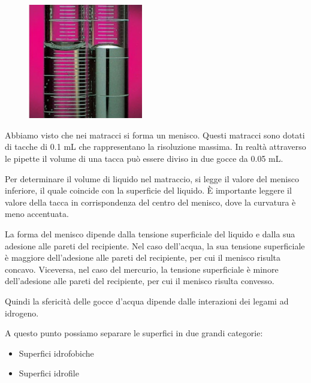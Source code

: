 \hspace{0.5cm}\begin{minipage}{0.35 \textwidth}
   \begin{figure}[H]
       \includegraphics[width=5cm]{immagini/menischi.png}
   \end{figure}
\end{minipage}
\begin{minipage}{0.6 \textwidth}
   \vspace{0.6cm}Abbiamo visto che nei matracci si forma un menisco.
   Questi matracci sono dotati di tacche di 0.1 mL che rappresentano la risoluzione massima. In realtà attraverso le pipette il volume di una tacca può essere diviso in due gocce da 0.05 mL.

   Per determinare il volume di liquido nel matraccio, si legge il valore del menisco inferiore, il quale coincide con la superficie del liquido. È importante leggere il valore della tacca in corrispondenza del centro del menisco, dove la curvatura è meno accentuata.
\end{minipage}

\vspace{0.2cm}La forma del menisco dipende dalla tensione superficiale del liquido e dalla sua adesione alle pareti del recipiente. Nel caso dell'acqua, la sua tensione superficiale è maggiore dell'adesione alle pareti del recipiente, per cui il menisco risulta concavo. Viceversa, nel caso del mercurio, la tensione superficiale è minore dell'adesione alle pareti del recipiente, per cui il menisco risulta convesso.

Quindi la sfericità delle gocce d'acqua dipende dalle interazioni dei legami ad idrogeno.

A questo punto possiamo separare le superfici in due grandi categorie:
\vspace{-0.1cm}
\begin{itemize}
   \item Superfici idrofobiche
   \vspace{-0.1cm}
   \item Superfici idrofile
\end{itemize}

